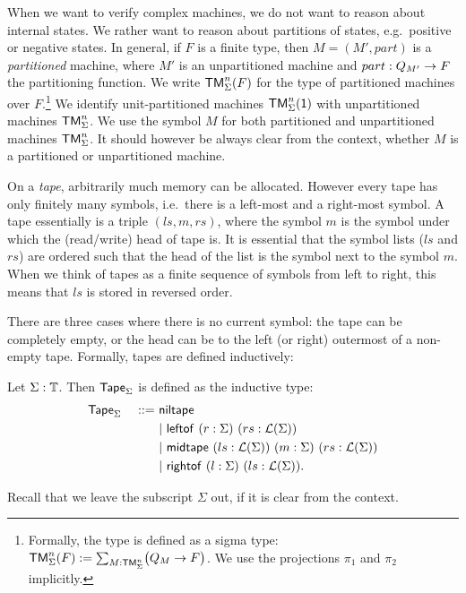 When we want to verify complex machines, we do not want to reason about internal states.  We rather want to reason about partitions of states, e.g.\
positive or negative states.  In general, if $F$ is a finite type, then $M = (M', part)$ is a \emph{partitioned} machine, where $M'$ is an
unpartitioned machine and $part : Q_{M'} \rightarrow F$ the partitioning function.  We write $\mathsf{TM}_\Sigma^n(F)$ for the type of partitioned machines
over $F$.\footnote{Formally, the type is defined as a sigma type: $\mathsf{TM}_\Sigma^n(F) := \sum_{M:\mathsf{TM}_\Sigma^n}\bigl(Q_M \rightarrow F\bigr)$.  We use the
  projections $\pi_1$ and $\pi_2$ implicitly.}  We identify unit-partitioned machines $\mathsf{TM}_\Sigma^n(\mathsf{1})$ with unpartitioned machines
$\mathsf{TM}_\Sigma^n$.  We use the symbol $M$ for both partitioned and unpartitioned machines $\mathsf{TM}_\Sigma^n$.  It should however be always clear from the
context, whether $M$ is a partitioned or unpartitioned machine.

On a \emph{tape}, arbitrarily much memory can be allocated.  However every tape has only finitely many symbols, i.e.\ there is a left-most and a
right-most symbol.  A tape essentially is a triple $(ls,m,rs)$, where the symbol $m$ is the symbol under which the (read/write) head of tape is.  It
is essential that the symbol lists ($ls$ and $rs$) are ordered such that the head of the list is the symbol next to the symbol $m$.  When we think of
tapes as a finite sequence of symbols from left to right, this means that $ls$ is stored in reversed order.

There are three cases where there is no current symbol: the tape can be completely empty, or the head can be to the left (or right) outermost of a
non-empty tape.  Formally, tapes are defined inductively:

\begin{definition}[Tape][tape]
  \label{def:tape}
  Let $\Sigma : \mathbb{T}$.  Then $\mathsf{Tape}_\Sigma$ is defined as the inductive type:
  \begin{alignat*}{2}
    & \mathsf{Tape}_\Sigma &~::=~& \mathsf{niltape} \\
    &&& |~ \mathsf{leftof}  ~ (r:\Sigma) ~ (rs:\mathcal{L}(\Sigma)) \\
    &&& |~ \mathsf{midtape} ~ (ls:\mathcal{L}(\Sigma)) ~ (m:\Sigma) ~ (rs:\mathcal{L}(\Sigma)) \\
    &&& |~ \mathsf{rightof} ~ (l:\Sigma) ~ (ls:\mathcal{L}(\Sigma)).
  \end{alignat*}
\end{definition}

Recall that we leave the subscript $\Sigma$ out, if it is clear from the context.


